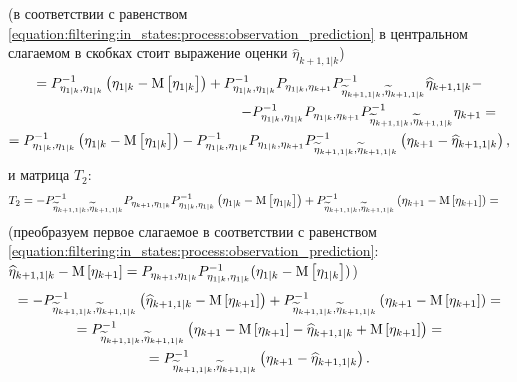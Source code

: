 (в соответствии с равенством \eqref{equation:filtering:in_states:process:observation_prediction} в центральном слагаемом в скобках стоит выражение
оценки $\widehat{\eta}_{k+1, 1|k}$)
\begin{multline*}
	= P_{\eta_{1|k},\eta_{1|k}}^{-1} \centered{\eta_{1|k}}
		+ P_{\eta_{1|k},\eta_{1|k}}^{-1} P_{\eta_{1|k}, \eta_{k+1}} P_{\widetilde{\eta}_{k+1, 1|k}, \widetilde{\eta}_{k+1, 1|k}}^{-1} \widehat{\eta}_{k+1, 1|k} - \\
		\shoveright{ - P_{\eta_{1|k},\eta_{1|k}}^{-1} P_{\eta_{1|k}, \eta_{k+1}} P_{\widetilde{\eta}_{k+1, 1|k}, \widetilde{\eta}_{k+1, 1|k}}^{-1} \eta_{k+1} = } \\
	= P_{\eta_{1|k},\eta_{1|k}}^{-1} \centered{\eta_{1|k}}
		- P_{\eta_{1|k},\eta_{1|k}}^{-1} P_{\eta_{1|k}, \eta_{k+1}} P_{\widetilde{\eta}_{k+1, 1|k}, \widetilde{\eta}_{k+1, 1|k}}^{-1} \left ( \eta_{k+1} - \widehat{\eta}_{k+1, 1|k} \right )
	,
\end{multline*}
и матрица $T_2$:
$$
	\shoveright{
		T_2 =
			- P_{\widetilde{\eta}_{k+1, 1|k}, \widetilde{\eta}_{k+1, 1|k}}^{-1} P_{\eta_{k+1}, \eta_{1|k}} P_{\eta_{1|k},\eta_{1|k}}^{-1} \centered{\eta_{1|k}}
			+ P_{\widetilde{\eta}_{k+1, 1|k}, \widetilde{\eta}_{k+1, 1|k}}^{-1} \centered{\eta_{k+1}}
			=
	}
$$
(преобразуем первое слагаемое в соответствии с равенством \eqref{equation:filtering:in_states:process:observation_prediction}:
$\widehat{\eta}_{k+1,1|k} - \mathrm{M} \left [ \eta_{k+1} \right ] = P_{\eta_{k+1},\eta_{1|k}}P_{\eta_{1|k},\eta_{1|k}}^{-1} ( \eta_{1|k} - \mathrm{M} \left [ \eta_{1|k} \right ] )$)
\begin{multline*}
	= - P_{\widetilde{\eta}_{k+1, 1|k}, \widetilde{\eta}_{k+1, 1|k}}^{-1} \left ( \widehat{\eta}_{k+1,1|k} - \mathrm{M} \left [ \eta_{k+1} \right ] \right )
		+ P_{\widetilde{\eta}_{k+1, 1|k}, \widetilde{\eta}_{k+1, 1|k}}^{-1} \left ( \eta_{k+1} - \mathrm{M} \left [ \eta_{k+1} \right ] \right ) = \\
	= P_{\widetilde{\eta}_{k+1, 1|k}, \widetilde{\eta}_{k+1, 1|k}}^{-1}
		\left ( \eta_{k+1} - \mathrm{M} \left [ \eta_{k+1} \right ] - \widehat{\eta}_{k+1, 1|k} + \mathrm{M} \left [ \eta_{k+1} \right ] \right ) = \\
	= P_{\widetilde{\eta}_{k+1, 1|k}, \widetilde{\eta}_{k+1, 1|k}}^{-1} \left ( \eta_{k+1} - \widehat{\eta}_{k+1, 1|k} \right ) .
\end{multline*}

